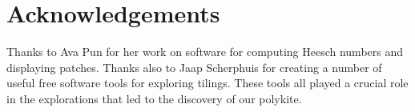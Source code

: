 \documentclass[12pt]{article}
\begin{document}


\section*{Acknowledgements}
\label{sec:acks}

Thanks to Ava Pun for her work on software for computing Heesch numbers
and displaying patches.  Thanks also to Jaap Scherphuis for creating a
number of useful free software tools for exploring tilings.  These tools
all played a crucial role in the explorations that led to the discovery of
our polykite.

\appendix




%
%



\end{document}
